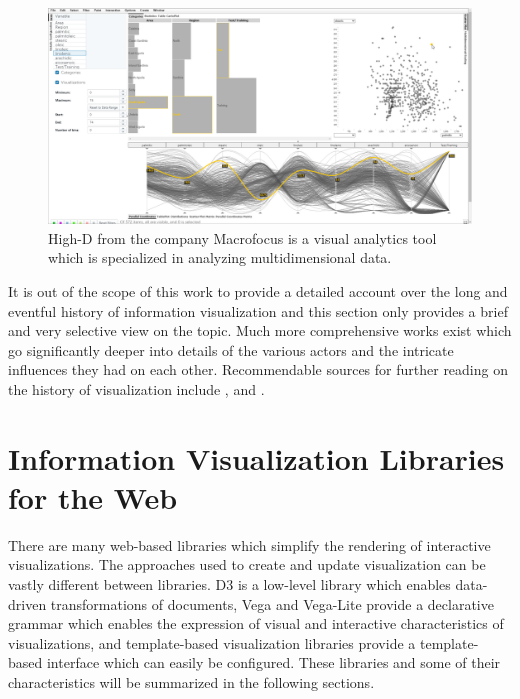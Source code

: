 \begin{figure}[tp]
    \centering
    \includegraphics[keepaspectratio,width=\linewidth,height=\fullh / 3]
    {images/high-d.png}
    \caption[Screenshot of High-D]{
        High-D from the company Macrofocus is a visual analytics tool which is specialized in analyzing multidimensional data. 
         
    }
    \label{fig:HighD}
\end{figure}

It is out of the scope of this work to provide a detailed account over the long and eventful history of information visualization and this section only provides a brief and very selective view on the topic. Much more comprehensive works exist which go significantly deeper into details of the various actors and the intricate influences they had on each other. Recommendable sources for further reading on the history of visualization include \cite{BriefHistoryOfDataVis}, \cite{HistoryOfDataVisAndGraphicCommunication} and \cite{HistoryOfInformationGraphics}.

\section{Information Visualization Libraries for the Web}

There are many web-based libraries which simplify the rendering of interactive visualizations. The approaches used to create and update visualization can be vastly different between libraries. D3 is a low-level library which enables data-driven transformations of documents, Vega and Vega-Lite provide a declarative grammar which enables the expression of visual and interactive characteristics of visualizations, and template-based visualization libraries provide a template-based interface which can easily be configured. These libraries and some of their characteristics will be summarized in the following sections.

